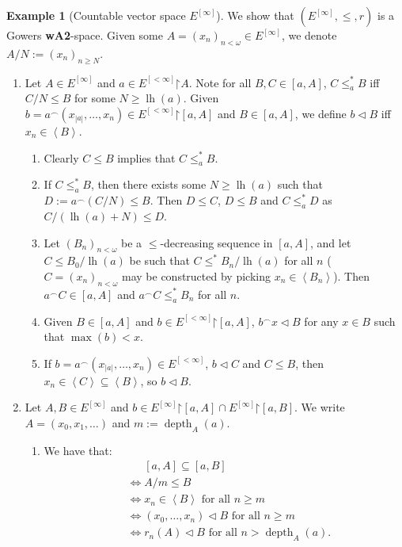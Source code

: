 \documentclass[11pt,reqno]{amsart}
\theoremstyle{plain}
\numberwithin{equation}{section}
\theoremstyle{definition}
\newtheorem{example}[theorem]{Example}
\newcommand{\func}{\operatorname}
\renewcommand{\c}[1]{\left\langle #1 \right\rangle}
\newcommand{\iffbreak}{\phantom{{} \iff {}}}
\newcommand{\restrictedto}{\mathord{\upharpoonright}}
\newcommand{\lh}{\func{lh}}
\newcommand{\depth}{\func{depth}}
\begin{document}
\begin{example}[Countable vector space $E^{[\infty]}$]
    We show that $(E^{[\infty]},\leq,r)$ is a Gowers \textbf{wA2}-space. Given some $A = (x_n)_{n<\omega} \in E^{[\infty]}$, we denote $A/N := (x_n)_{n \geq N}$.
    \begin{enumerate}
        \item[(\textbf{G1}-\textbf{5})] Let $A \in E^{[\infty]}$ and $a \in E^{[<\infty]}\restrictedto A$. Note for all $B,C \in [a,A]$, $C \leq_a^* B$ iff $C/N \leq B$ for some $N \geq \lh(a)$. Given $b = a^\frown(x_{|a|},\dots,x_n) \in E^{[<\infty]}\restrictedto[a,A]$ and $B \in [a,A]$, we define $b \lhd B$ iff $x_n \in \c{B}$.
        \begin{enumerate}[label=(\arabic*)]
            \item Clearly $C \leq B$ implies that $C \leq_a^* B$.
            
            \item If $C \leq_a^* B$, then there exists some $N \geq \lh(a)$ such that $D := a^\frown(C/N) \leq B$. Then $D \leq C$, $D \leq B$ and $C \leq_a^* D$ as $C/(\lh(a) + N) \leq D$.
            
            \item Let $(B_n)_{n<\omega}$ be a $\leq$-decreasing sequence in $[a,A]$, and let $C \leq B_0/\lh(a)$ be such that $C \leq^* B_n/\lh(a)$ for all $n$ ($C = (x_n)_{n<\omega}$ may be constructed by picking $x_n \in \c{B_n}$). Then $a^\frown C \in [a,A]$ and $a^\frown C \leq_a^* B_n$ for all $n$.
            
            \item Given $B \in [a,A]$ and $b \in E^{[<\infty]}\restrictedto[a,A]$, $b^\frown x \lhd B$ for any $x \in B$ such that $\max(b) < x$.
            
            \item If $b = a^\frown(x_{|a|},\dots,x_n) \in E^{[<\infty]}$, $b \lhd C$ and $C \leq B$, then $x_n \in \c{C} \subseteq \c{B}$, so $b \lhd B$.
        \end{enumerate}

        \item[(\textbf{G6})] Let $A,B \in E^{[\infty]}$ and $b \in E^{[\infty]}\restrictedto[a,A] \cap E^{[\infty]}\restrictedto[a,B]$. We write $A = (x_0,x_1,\dots)$ and $m := \depth_A(a)$. 
        \begin{enumerate}[label=(\arabic*)]
            \item We have that:
            \begin{align*}
                &\iffbreak [a,A] \subseteq [a,B] \\
                &\iff A/m \leq B \\
                &\iff x_n \in \c{B} \text{ for all $n \geq m$} \\
                &\iff (x_0,\dots,x_n) \lhd B \text{ for all $n \geq m$} \\
                &\iff r_n(A) \lhd B \text{ for all $n > \depth_A(a)$}.
            \end{align*}


\end{enumerate}
\end{enumerate}
\end{example}
\end{document}
